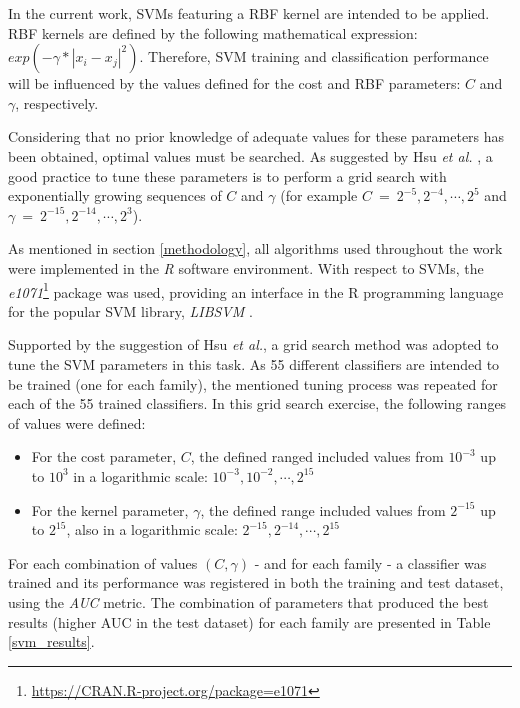 \documentclass[11pt]{article}
\begin{document}
In the current work, SVMs featuring a RBF kernel are intended to be applied. RBF kernels are defined by the following mathematical expression: $exp(- \gamma * |x_{i}-x_{j}|^2) $. Therefore, SVM training and classification performance will be influenced by the values defined for the cost and RBF parameters: $C$ and $\gamma$, respectively.

Considering that no prior knowledge of adequate values for these parameters has been obtained, optimal values must be searched. As suggested by Hsu \emph{et al.} \cite{hsu2003practical}, a good practice to tune these parameters is to perform a grid search with exponentially growing sequences of $C$ and $\gamma$ (for example $C \: = \: 2^{-5}, 2^{-4}, \cdots , 2^{5}$ and $\gamma \: = \: 2^{-15}, 2^{-14}, \cdots , 2^{3}$).

As mentioned in section \ref{methodology}, all algorithms used throughout the work were implemented in the \emph{R} software environment. With respect to SVMs, the \emph{e1071}\footnote{\url{https://CRAN.R-project.org/package=e1071}} package was used, providing an interface in the R programming language for the popular SVM library, \emph{LIBSVM} \cite{CC01a}.

Supported by the suggestion of Hsu \emph{et al.}, a grid search method was adopted to tune the SVM parameters in this task. As 55 different classifiers are intended to be trained (one for each family), the mentioned tuning process was repeated for each of the 55 trained classifiers. In this grid search exercise, the following ranges of values were defined:

\begin{itemize}
	\item For the cost parameter, $C$, the defined ranged included values from $10^{-3}$ up to $10^{3}$ in a logarithmic scale: $10^{-3}, 10^{-2}, \cdots , 2^{15}$
	
	\item For the kernel parameter, $\gamma$, the defined range included values from $2^{-15}$ up to $2^{15}$, also in a logarithmic scale: $2^{-15}, 2^{-14}, \cdots , 2^{15}$
\end{itemize}

For each combination of values $(C, \gamma)$ - and for each family - a classifier was trained and its performance was registered in both the training and test dataset, using the \emph{AUC} metric. The combination of parameters that produced the best results (higher AUC in the test dataset) for each family are presented in Table \ref{svm_results}.
\end{document}
